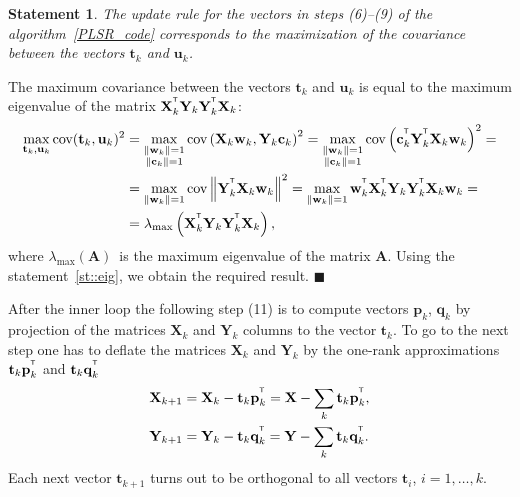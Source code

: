 \documentclass[preprint,12pt]{elsarticle}
\newtheorem{statement}{Statement}
\newcommand{\bw}{\mathbf{w}}
\newcommand{\bY}{\mathbf{Y}}
\newcommand{\bX}{\mathbf{X}}
\newcommand{\bu}{\mathbf{u}}
\newcommand{\bt}{\mathbf{t}}
\newcommand{\bp}{\mathbf{p}}
\newcommand{\bq}{\mathbf{q}}
\newcommand{\bc}{\mathbf{c}}
\newcommand{\T}{^{\text{\tiny\sffamily\upshape\mdseries T}}}
\begin{document}
\begin{statement}
	
	The update rule for the vectors in steps (6)--(9) of the algorithm~\ref{PLSR_code} corresponds to the maximization of the covariance between the vectors $\bt_k$ and $\bu_k$.
\end{statement}

The maximum covariance between the vectors $\bt_k$ and $\bu_k$ is equal to the maximum eigenvalue of the matrix $\bX_k^{\T} \bY_k \bY_k^{\T} \bX_k$:
\begin{align*}
\max_{\bt_k, \bu_k}  \text{cov} (\bt_k, \bu_k)^2 &= \max_{\substack{\|\bw_k\|=1 \\ \|\bc_k\| = 1}} \text{cov} \left( \bX_k \bw_k, \bY_k \bc_k \right)^2 = \max_{\substack{\|\bw_k\|=1 \\ \|\bc_k\| = 1}} \text{cov} \left(\bc_k^{\T}  \bY_k^{\T} \bX_k \bw_k \right)^2 = \\
&= \max_{\|\bw_k\| = 1} \text{cov} \left\|\bY_k^{\T} \bX_k \bw_k \right\|^2 = \max_{\|\bw_k\| = 1} \bw_k^{\T} \bX_k^{\T} \bY_k \bY_k^{\T} \bX_k \bw_k = \\
& = \lambda_{\max} \left( \bX_k^{\T} \bY_k \bY_k^{\T} \bX_k \right),
\end{align*}
where $ \lambda_{\max} (\mathbf{A})$~is the maximum eigenvalue of the matrix $\mathbf{A}$.
Using the statement~\ref{st::eig}, we obtain the required result.
$\blacksquare$

After the inner loop the following step (11) is to compute vectors $\bp_k$, $\bq_k$ by projection of the matrices $\bX_k$ and $\bY_k$ columns to the vector $\bt_k$. 
To go to the next step one has to deflate the matrices $\bX_k$ and $\bY_k$ by the one-rank approximations $\bt_k \bp_k^{\T}$ and $\bt_k \bq_k^{\T}$
\begin{align*}
\bX_{k + 1} &= \bX_{k} - \bt_k \bp_k^{\T} = \bX - \sum_k \bt_k \bp_k^{\T}, \\
\bY_{k + 1} &= \bY_{k} - \bt_k \bq_k^{\T} = \bY - \sum_k \bt_k \bq_k^{\T}.
\end{align*}
Each next vector $\bt_{k+1}$ turns out to be orthogonal to all vectors $\bt_i$, $i=1, \dots, k$.
\end{document}

